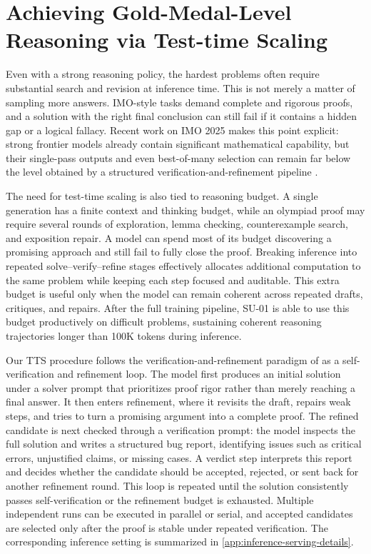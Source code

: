 \section{Achieving Gold-Medal-Level Reasoning via Test-time Scaling}
\label{sec:tts}

Even with a
strong reasoning policy, the hardest problems often require substantial search
and revision at inference time. This is not merely a matter of sampling more
answers. IMO-style tasks demand complete and rigorous proofs, and a solution
with the right final conclusion can still fail if it contains a hidden gap or a
logical fallacy. Recent work on IMO 2025 makes this point explicit: strong
frontier models already contain significant mathematical capability, but their
single-pass outputs and even best-of-many selection can remain far below the
level obtained by a structured verification-and-refinement pipeline
\citep{huang2025winning}. 

The need for test-time scaling is also tied to reasoning budget. A single generation has a
finite context and thinking budget, while an olympiad proof may require several
rounds of exploration, lemma checking, counterexample search, and exposition
repair. A model can spend most of its budget discovering a promising approach
and still fail to fully close the proof. Breaking inference into repeated
solve--verify--refine stages effectively allocates additional computation to the
same problem while keeping each step focused and auditable. This extra budget is
useful only when the model can remain coherent across repeated drafts,
critiques, and repairs. 
After the full training pipeline, SU-01 is able to use
this budget productively on difficult problems, sustaining coherent reasoning
trajectories longer than 100K tokens during inference.

Our TTS procedure follows the verification-and-refinement paradigm of
\citet{huang2025winning} as a self-verification and refinement loop. The model
first produces an initial solution under a solver prompt that prioritizes proof
rigor rather than merely reaching a final answer. It then enters refinement,
where it revisits the draft, repairs weak steps, and tries to turn a promising
argument into a complete proof. The refined candidate is next checked through a
verification prompt: the model inspects the full solution and writes a structured
bug report, identifying issues such as critical errors, unjustified claims, or
missing cases. A verdict step interprets this report and decides whether the
candidate should be accepted, rejected, or sent back for another refinement
round. This loop is repeated until the solution consistently passes
self-verification or the refinement budget is exhausted. Multiple independent
runs can be executed in parallel or serial, and accepted candidates are selected
only after the proof is stable under repeated verification. The corresponding
inference setting is summarized in \cref{app:inference-serving-details}.

